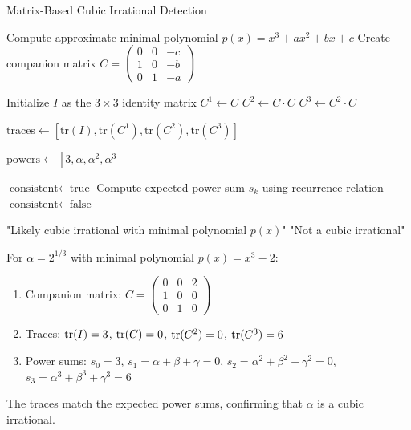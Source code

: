 \begin{algorithm}
\caption{Matrix-Based Cubic Irrational Detection}
\label{alg:matrix_detection}
\begin{algorithmic}[1]
    \State Compute approximate minimal polynomial $p(x) = x^3 + ax^2 + bx + c$
    \State Create companion matrix $C = \begin{pmatrix} 0 & 0 & -c \\ 1 & 0 & -b \\ 0 & 1 & -a \end{pmatrix}$
    
    \State Initialize $I$ as the $3 \times 3$ identity matrix
    \State $C^1 \gets C$
    \State $C^2 \gets C \cdot C$
    \State $C^3 \gets C^2 \cdot C$
    
    \State $\text{traces} \gets [\text{tr}(I), \text{tr}(C^1), \text{tr}(C^2), \text{tr}(C^3)]$
    
    \State $\text{powers} \gets [3, \alpha, \alpha^2, \alpha^3]$
    
    \State $\text{consistent} \gets \text{true}$
        \State Compute expected power sum $s_k$ using recurrence relation
            \State $\text{consistent} \gets \text{false}$
        \EndIf
    \EndFor
    
        \State \Return "Likely cubic irrational with minimal polynomial $p(x)$"
    \Else
        \State \Return "Not a cubic irrational"
    \EndIf
\EndProcedure
\end{algorithmic}
\end{algorithm}

\begin{example}
For $\alpha = 2^{1/3}$ with minimal polynomial $p(x) = x^3 - 2$:
\begin{enumerate}
    \item Companion matrix: $C = \begin{pmatrix} 0 & 0 & 2 \\ 1 & 0 & 0 \\ 0 & 1 & 0 \end{pmatrix}$
    \item Traces: $\operatorname{tr}(I) = 3$, $\operatorname{tr}(C) = 0$, $\operatorname{tr}(C^2) = 0$, $\operatorname{tr}(C^3) = 6$
    \item Power sums: $s_0 = 3$, $s_1 = \alpha + \beta + \gamma = 0$, $s_2 = \alpha^2 + \beta^2 + \gamma^2 = 0$, $s_3 = \alpha^3 + \beta^3 + \gamma^3 = 6$
\end{enumerate}

The traces match the expected power sums, confirming that $\alpha$ is a cubic irrational.
\end{example}

